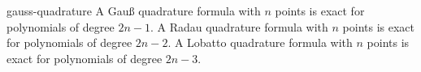 \begin{Lemma}{gauss-quadrature}
  A Gauß quadrature formula with $n$ points is exact for polynomials
  of degree $2n-1$. A Radau quadrature formula with $n$ points is
  exact for polynomials of degree $2n-2$. A Lobatto quadrature formula
  with $n$ points is exact for polynomials of degree $2n-3$.
\end{Lemma}
